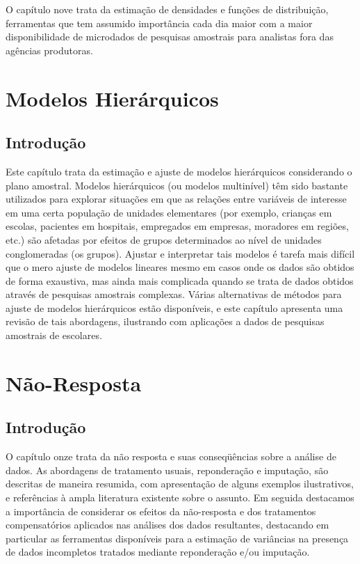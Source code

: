 \documentclass[
]{book}
\begin{document}
O capítulo nove trata da estimação de densidades e funções de distribuição,
ferramentas que tem assumido importância cada dia maior com a maior disponibilidade
de microdados de pesquisas amostrais para analistas fora das agências produtoras.

\hypertarget{modelos-hieruxe1rquicos}{%
\chapter{Modelos Hierárquicos}\label{modelos-hieruxe1rquicos}}

\hypertarget{introduuxe7uxe3o-4}{%
\section{Introdução}\label{introduuxe7uxe3o-4}}

Este capítulo trata da estimação e ajuste de modelos hierárquicos
considerando o plano amostral. Modelos hierárquicos (ou modelos multinível) têm sido
bastante utilizados para explorar situações em que as relações entre variáveis de
interesse em uma certa população de unidades elementares (por exemplo, crianças em escolas, pacientes em hospitais, empregados em empresas, moradores em regiões, etc.) são afetadas por efeitos de grupos determinados ao nível de unidades conglomeradas (os grupos). Ajustar e interpretar tais modelos é tarefa mais difícil que o mero ajuste de modelos lineares mesmo em casos onde os dados são obtidos de forma exaustiva, mas ainda mais complicada quando se trata de dados obtidos através de pesquisas amostrais complexas. Várias alternativas de métodos para ajuste de modelos hierárquicos estão disponíveis, e este capítulo apresenta uma revisão de tais abordagens, ilustrando com aplicações a dados de pesquisas amostrais de escolares.

\hypertarget{nuxe3o-resposta}{%
\chapter{Não-Resposta}\label{nuxe3o-resposta}}

\hypertarget{introduuxe7uxe3o-5}{%
\section{Introdução}\label{introduuxe7uxe3o-5}}

O capítulo onze trata da não resposta e suas conseqüências sobre a análise de dados.
As abordagens de tratamento usuais, reponderação e imputação, são descritas de maneira
resumida, com apresentação de alguns exemplos ilustrativos, e referências à ampla literatura existente sobre o assunto. Em seguida destacamos a importância de considerar os efeitos da não-resposta e dos tratamentos compensatórios aplicados nas análises dos dados resultantes, destacando em particular as ferramentas disponíveis para a estimação de variâncias na presença de dados incompletos tratados mediante reponderação e/ou imputação.
\end{document}
